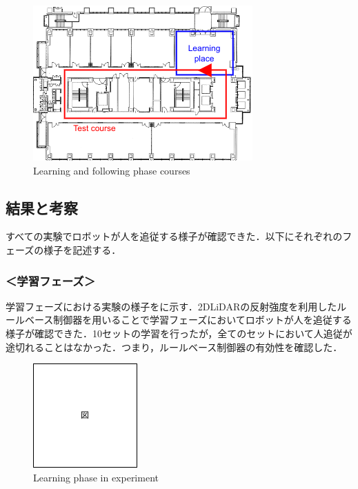   \begin{figure}[h]
    \centering
    \includegraphics[keepaspectratio, scale=0.70] {images/RobotGuidance_course.png}
    \captionsetup{justification=raggedright} %
    \caption{Learning and following phase courses}
    \label{Fig:RobotGuidance_course}
  \end{figure}

\newpage

\subsection{結果と考察}

  すべての実験でロボットが人を追従する様子が確認できた．以下にそれぞれのフェーズの様子を記述する．

  \subsubsection*{＜学習フェーズ＞}
  
  学習フェーズにおける実験の様子をに示す．2DLiDARの反射強度を利用したルールベース制御器を用いることで学習フェーズにおいてロボットが人を追従する様子が確認できた．10セットの学習を行ったが，全てのセットにおいて人追従が途切れることはなかった．つまり，ルールベース制御器の有効性を確認した．

  \begin{figure}[h]
    \centering
    \includegraphics[keepaspectratio, scale=0.80] {images/figure.png}
    \captionsetup{justification=raggedright} %
    \caption{Learning phase in experiment}
    \label{Fig:Learning phase in experiment}
  \end{figure}

